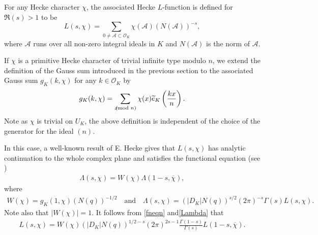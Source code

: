 \documentclass[twoside,leqno,10pt, A4]{amsart}
\begin{document}
 For any Hecke character $\chi$, the associated Hecke $L$-function is defined for $\Re(s) > 1$ to be
\begin{equation*}
  L(s, \chi) = \sum_{0 \neq \mathcal{A} \subset
  \mathcal{O}_K}\chi(\mathcal{A})(N(\mathcal{A}))^{-s},
\end{equation*}
where $\mathcal{A}$ runs over all non-zero integral ideals in $K$ and $N(\mathcal{A})$ is the norm of $\mathcal{A}$. \newline

If $\chi$ is a primitive Hecke character of trivial infinite type modulo $n$, we extend the definition of the Gauss sum introduced in the
previous section to the associated Gauss sum $g_K(k, \chi)$ for any $k \in \mathcal{O}_K$ by
\begin{align*}
 g_K(k,\chi) = \sum_{x \negthickspace \negthickspace \negthickspace \pmod{n}} \chi(x) \widetilde{e}_K\left(\frac{kx}{n}\right).
\end{align*}
Note as $\chi$ is trivial on $U_K$, the above definition is independent of the choice of the generator for the ideal $(n)$. \newline

In this case, a well-known result of E. Hecke gives that $L(s, \chi)$ has analytic continuation to the whole complex plane and satisfies the functional equation (see \cite[Theorem 3.8]{iwakow})
\begin{align}
\label{fneqn}
  \Lambda(s, \chi) = W(\chi)\Lambda(1-s, \overline\chi),
\end{align}
 where
\begin{align} \label{Lambda}
  W(\chi) = g_K(1,\chi)(N(q))^{-1/2} \quad \mbox{and} \quad \Lambda(s, \chi) = (|D_K|N(q))^{s/2}(2\pi)^{-s}\Gamma(s)L(s, \chi).
\end{align}
  Note also that $|W(\chi)|=1$.  It follows from \eqref{fneqn} and\eqref{Lambda} that
\begin{align}
\label{fneqnL}
  L(s, \chi)=W(\chi)(|D_K|N(q))^{1/2-s}(2\pi)^{2s-1}\frac {\Gamma(1-s)}{\Gamma (s)}L(1-s, \overline\chi).
\end{align}





\end{document}
